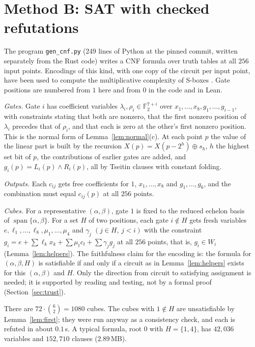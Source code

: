 \documentclass[11pt,a4paper]{article}
\theoremstyle{definition}
\newcommand{\F}{\mathbb{F}}
\newcommand{\spn}{\operatorname{span}}
\newcommand{\code}[1]{\texttt{#1}}
\begin{document}
\section{Method B: SAT with checked refutations}\label{sec:sat}

The program \code{gen\_cnf.py} (249 lines of Python at the pinned commit, written separately from the Rust code) writes a CNF formula over truth tables at all $256$ input points. Encodings of this kind, with one copy of the circuit per input point, have been used to compute the multiplicative complexity of S-boxes \cite{Stoffelen16}. Gate positions are numbered from $1$ here and from $0$ in the code and in Lean.

\emph{Gates.} Gate $i$ has coefficient variables $\lambda_i,\rho_i\in\F_2^{7+i}$ over $x_1,\dots,x_8,g_1,\dots,g_{i-1}$, with constraints stating that both are nonzero, that the first nonzero position of $\lambda_i$ precedes that of $\rho_i$, and that each is zero at the other's first nonzero position. This is the normal form of Lemma~\ref{lem:normal}(c). At each point $p$ the value of the linear part is built by the recursion $X(p)=X(p-2^h)\oplus s_h$, $h$ the highest set bit of $p$, the contributions of earlier gates are added, and $g_i(p)=L_i(p)\wedge R_i(p)$, all by Tseitin clauses with constant folding.

\emph{Outputs.} Each $c_{ij}$ gets free coefficients for $1$, $x_1,\dots,x_8$ and $g_1,\dots,g_6$, and the combination must equal $c_{ij}(p)$ at all $256$ points.

\emph{Cubes.} For a representative $(\alpha,\beta)$, gate $1$ is fixed to the reduced echelon basis of $\spn\{\alpha,\beta\}$. For a set $H$ of two positions, each gate $i\notin H$ gets fresh variables $e,\ell_1,\dots,\ell_8,\mu_1,\dots,\mu_4$ and $\gamma_j$ $(j\in H,\ j<i)$ with the constraint $g_i=e+\sum\ell_kx_k+\sum\mu_tc_t+\sum\gamma_jg_j$ at all $256$ points, that is, $g_i\in W_i$ (Lemma~\ref{lem:helpers}). The faithfulness claim for the encoding is: the formula for $(\alpha,\beta,H)$ is satisfiable if and only if a circuit as in Lemma~\ref{lem:helpers} exists for this $(\alpha,\beta)$ and $H$. Only the direction from circuit to satisfying assignment is needed; it is supported by reading and testing, not by a formal proof (Section~\ref{sec:trust}).

There are $72\cdot\binom{6}{2}=1080$ cubes. The cubes with $1\notin H$ are unsatisfiable by Lemma~\ref{lem:first}; they were run anyway as a consistency check, and each is refuted in about $0.1$\,s. A typical formula, root $0$ with $H=\{1,4\}$, has $42{,}036$ variables and $152{,}710$ clauses ($2.89$\,MB).
\end{document}
